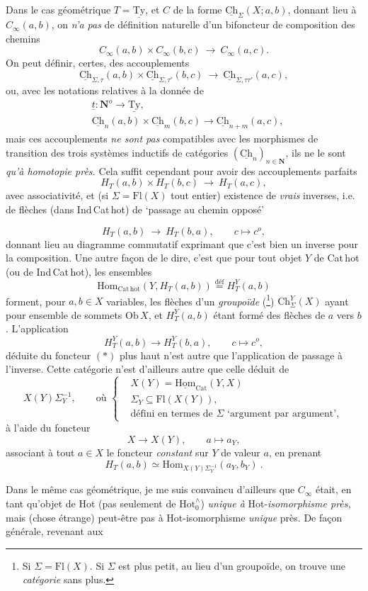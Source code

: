 \documentclass[11pt]{article}
\newcommand{\printedpage}[1]{\marginpar{\footnotesize p.~#1}}
\newcommand{\msp}[1]{\marginpar{\vspace*{10pt}\footnotesize [#1]}}
\newcommand{\Ch}{\underline{\mathrm{Ch}}}
\newcommand{\Ty}{\underline{\mathrm{Ty}}}
\newcommand{\Hotz}{\mathrm{Hot}^{\wedge}_{0}}
\begin{document}
\msp{page 115}
Dans le cas géométrique $T = \Ty$, et $C$ de la forme $\Ch_{\Sigma}(X;a,b)$, donnant lieu à $C_{\infty}(a,b)$, on \textit{n'a pas} de définition naturelle d'un bifoncteur de composition des chemins
\[
C_{\infty}(a,b) \times C_{\infty}(b,c) \ \longrightarrow\ C_{\infty}(a,c).
\]
On peut définir, certes, des accouplements
\[
\Ch_{\Sigma,\tau}(a,b) \times \Ch_{\Sigma,\tau'}(b,c) \ \longrightarrow\ \Ch_{\Sigma,\tau\tau'}(a,c),
\]
ou, avec les notations relatives à la donnée de
\[
\begin{aligned}
&\underline{t} : \mathbf{N}^{o} \longrightarrow \Ty,\\
&\Ch_{n}(a,b) \times \Ch_{m}(b,c) \longrightarrow \Ch_{n+m}(a,c),
\end{aligned}
\]
\printedpage{73}
mais ces accouplements \textit{ne sont pas} compatibles avec les morphismes de transition des trois systèmes inductifs de catégories $(\Ch_{n})_{n\in\mathbf{N}}$, ils ne le sont \textit{qu'à homotopie près.} Cela suffit cependant pour avoir des accouplements parfaits
\[
H_{T}(a,b) \times H_{T}(b,c) \ \longrightarrow\ H_{T}(a,c),
\]
avec associativité, et (si $\Sigma = \mathrm{Fl}(X)$ tout entier) existence de \textit{vrais} inverses, i.e. de flèches (dans Ind\,Cat\,hot) de `passage au chemin opposé'

\msp{page 116}
\[
H_{T}(a,b) \ \longrightarrow\ H_{T}(b,a), \qquad c \longmapsto c^{o}, \tag*{$(*)$}
\]
donnant lieu au diagramme commutatif exprimant que c'est bien un inverse pour la composition. Une autre façon de le dire, c'est que pour tout objet $Y$ de Cat\,hot (ou de Ind\,Cat\,hot), les ensembles
\[
\mathrm{Hom}_{\mathrm{Cat\,hot}}(Y, H_{T}(a,b)) \overset{\text{déf}}{=} H_{T}^{Y}(a,b)
\]
forment, pour $a,b \in X$ variables, les flèches d'un \textit{groupoïde} (\footnote[25]{Si $\Sigma = \mathrm{Fl}(X)$. Si $\Sigma$ est plus petit, au lieu d'un groupoïde, on trouve une \textit{catégorie} sans plus.}) $\mathrm{Ch}_{\Sigma}^{Y}(X)$ ayant pour ensemble de sommets $\mathrm{Ob}\,X$, et $H_{T}^{Y}(a,b)$ étant formé des flèches de $a$ vers $b$. L'application
\[
H_{T}^{Y}(a,b) \longrightarrow H_{T}^{Y}(b,a), \qquad c \longmapsto c^{o},
\]
déduite du foncteur $(*)$ plus haut n'est autre que l'application de passage à l'inverse. Cette catégorie n'est d'ailleurs autre que celle déduit de %
\[
X(Y)\Sigma_{Y}^{-1}, \qquad \text{où } \left\{
\begin{aligned}
&X(Y) = \underline{\mathrm{Hom}}_{\mathrm{Cat}}(Y,X)\\
&\Sigma_{Y} \subseteq \mathrm{Fl}(X(Y)),\\
&\text{défini en termes de } \Sigma \text{ `argument par argument'},
\end{aligned}
\right.
\]
à l'aide du foncteur
\[
X \longrightarrow X(Y), \qquad a \longmapsto a_{Y},
\]
\msp{page 117}
associant à tout $a \in X$ le foncteur \textit{constant} sur $Y$ de valeur $a$, en prenant
\[
H_{T}(a,b) \simeq \mathrm{Hom}_{X(Y)\Sigma_{Y}^{-1}}(a_{Y}, b_{Y}) \ .
\]

Dans le même cas géométrique, je me suis convaincu d'ailleurs que $C_{\infty}$ était, en tant qu'objet de Hot (pas seulement de $\Hotz$) \textit{unique à} Hot-\textit{isomorphisme près,} mais (chose étrange) peut-être pas à Hot-isomorphisme \textit{unique} près. De façon générale, revenant aux
\end{document}
